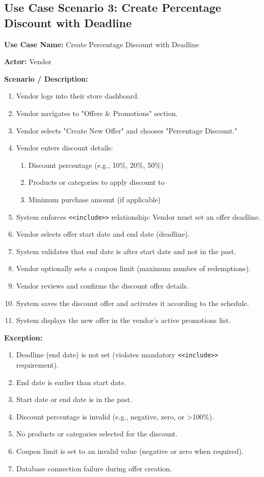 \subsection{Use Case Scenario 3: Create Percentage Discount with Deadline}

\textbf{Use Case Name:} Create Percentage Discount with Deadline

\textbf{Actor:} Vendor

\textbf{Scenario / Description:}
\begin{enumerate}
    \item Vendor logs into their store dashboard.
    \item Vendor navigates to "Offers \& Promotions" section.
    \item Vendor selects "Create New Offer" and chooses "Percentage Discount."
    \item Vendor enters discount details:
    \begin{enumerate}
        \item Discount percentage (e.g., 10\%, 20\%, 50\%)
        \item Products or categories to apply discount to
        \item Minimum purchase amount (if applicable)
    \end{enumerate}
    \item System enforces \texttt{\textless\textless include\textgreater\textgreater} relationship: Vendor must set an offer deadline.
    \item Vendor selects offer start date and end date (deadline).
    \item System validates that end date is after start date and not in the past.
    \item Vendor optionally sets a coupon limit (maximum number of redemptions).
    \item Vendor reviews and confirms the discount offer details.
    \item System saves the discount offer and activates it according to the schedule.
    \item System displays the new offer in the vendor's active promotions list.
\end{enumerate}

\textbf{Exception:}
\begin{enumerate}
    \item Deadline (end date) is not set (violates mandatory \texttt{\textless\textless include\textgreater\textgreater} requirement).
    \item End date is earlier than start date.
    \item Start date or end date is in the past.
    \item Discount percentage is invalid (e.g., negative, zero, or >100\%).
    \item No products or categories selected for the discount.
    \item Coupon limit is set to an invalid value (negative or zero when required).
    \item Database connection failure during offer creation.
\end{enumerate}

